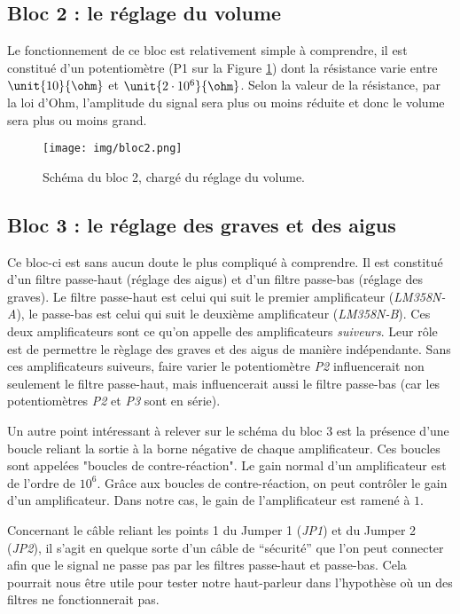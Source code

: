 \subsection{Bloc 2 : le réglage du volume}

Le fonctionnement de ce bloc est relativement simple à comprendre, il est constitué d'un potentiomètre (P1 sur la Figure \ref{bloc2}) dont la résistance varie entre $\unit{10}{\ohm}$ et $\unit{2 \cdot 10^{6}}{\ohm}$. Selon la valeur de la résistance, par la loi d'Ohm, l'amplitude du signal sera plus ou moins réduite et donc le volume sera plus ou moins grand.

\begin{figure}[h]
	\centering
	\texttt{[image: img/bloc2.png]}
	\caption{Schéma du bloc 2, chargé du réglage du volume.}
	\label{bloc2}
\end{figure}

\subsection{Bloc 3 : le réglage des graves et des aigus}

Ce bloc-ci est sans aucun doute le plus compliqué à comprendre. Il est constitué d'un filtre passe-haut (réglage des aigus) et d'un filtre passe-bas (réglage des graves).
Le filtre passe-haut est celui qui suit le premier amplificateur (\textit{LM358N-A}), le passe-bas est celui qui suit le deuxième amplificateur (\textit{LM358N-B}). 
Ces deux amplificateurs sont ce qu'on appelle des amplificateurs \textit{suiveurs}. Leur rôle est de permettre le règlage des graves et des aigus de manière indépendante.
Sans ces amplificateurs suiveurs, faire varier le potentiomètre \textit{P2} influencerait non seulement le filtre passe-haut, mais influencerait aussi le filtre passe-bas (car les potentiomètres \textit{P2} et \textit{P3} sont en série).

Un autre point intéressant à relever sur le schéma du bloc 3 est la présence d'une boucle reliant la sortie à la borne négative de chaque amplificateur. Ces boucles sont appelées "boucles de contre-réaction". 
Le gain normal d'un amplificateur est de l'ordre de $10^{6}$. Grâce aux boucles de contre-réaction, on peut contrôler le gain d'un amplificateur. 
Dans notre cas, le gain de l'amplificateur est ramené à $1$.

Concernant le câble reliant les points 1 du Jumper 1 (\textit{JP1}) et du Jumper 2 (\textit{JP2}), il s'agit en quelque sorte d'un câble de "`sécurité"' que l'on peut connecter afin que le signal ne passe pas par les filtres passe-haut et passe-bas. 
Cela pourrait nous être utile pour tester notre haut-parleur dans l'hypothèse où un des filtres ne fonctionnerait pas.

